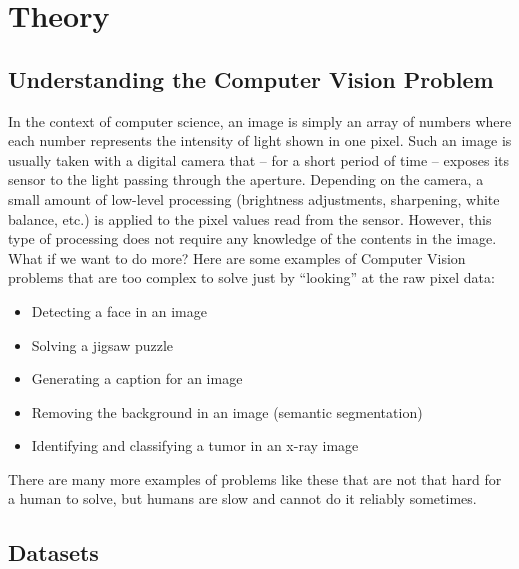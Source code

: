 \documentclass[]{article}
\begin{document}
	
\section{Theory}

	\subsection{Understanding the Computer Vision Problem}
		In the context of computer science, an image is simply an array of numbers where each number represents the intensity of light shown in one pixel.
		Such an image is usually taken with a digital camera that -- for a short period of time -- exposes its sensor to the light passing through the aperture.
		Depending on the camera, a small amount of low-level processing (brightness adjustments, sharpening, white balance, etc.\@) is applied to the pixel values read from the sensor.
		However, this type of processing does not require any knowledge of the contents in the image.
		What if we want to do more? 
		Here are some examples of Computer Vision problems that are too complex to solve just by ``looking'' at the raw pixel data:
		\begin{itemize}
			\item Detecting a face in an image 
			\item Solving a jigsaw puzzle
			\item Generating a caption for an image
			\item Removing the background in an image (semantic segmentation)
			\item Identifying and classifying a tumor in an x-ray image
		\end{itemize}
		There are many more examples of problems like these that are not that hard for a human to solve, but humans are slow and cannot do it reliably sometimes.
		
	\subsection{Datasets}
		
\end{document}
